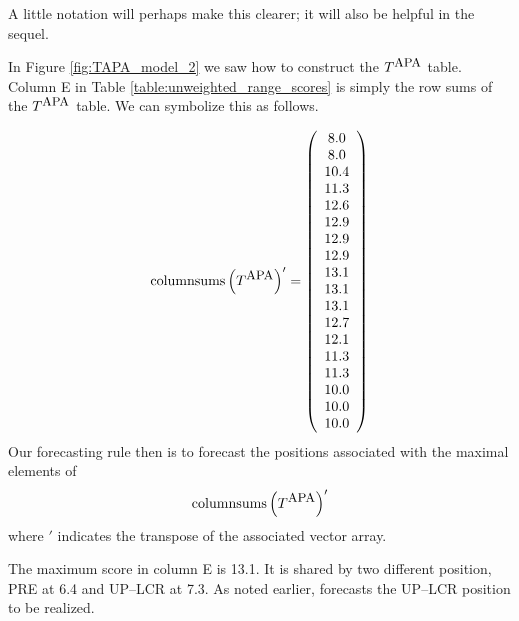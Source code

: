\begin{enumerate}
A little notation will perhaps make this clearer; it will also be helpful in the sequel.

In Figure \ref{fig:TAPA_model_2} we saw how to construct the $T^{\mbox{\small APA}}$ table.  Column E in Table \ref{table:unweighted_range_scores} is simply the row sums of the $T^{\mbox{\small APA}}$ table.  We can symbolize this as follows.

\begin{equation}
\mbox{columnsums}\left( T^{\mbox{\small APA}}\right)' = \left(\begin{array}{c}
8.0 \\
8.0 \\
10.4 \\
11.3 \\
12.6 \\
12.9 \\
12.9 \\
12.9 \\
13.1 \\
13.1 \\
13.1 \\
12.7 \\
12.1 \\
11.3 \\
11.3 \\
10.0 \\
10.0 \\
10.0 
\end{array}
\right)
\end{equation}
Our forecasting rule then is to forecast the positions associated with the maximal elements of 
\begin{equation}
\mbox{columnsums}\left( T^{\mbox{\small APA}}\right)'
\end{equation}
where $'$ indicates the transpose of the associated vector array.

The maximum score in column E is 13.1. %
It is shared by two different   {position}, PRE at 6.4 and UP--LCR at 7.3.  %
As noted earlier,  \cite{mesquita_1984} forecasts the UP--LCR   {position} to be realized.

  \renewcommand{\theenumi}{\arabic{enumi}}
\end{enumerate}



